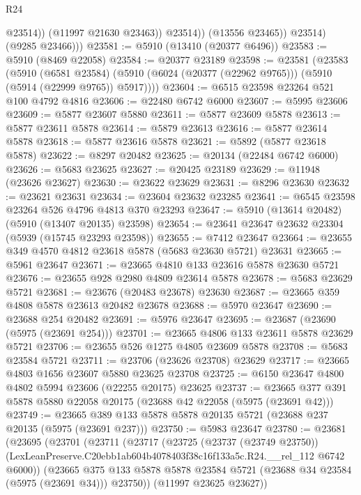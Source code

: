 \begin{lexlean}{R24}
\begin{coremodule}
                      @23514))
                  (@11997 @21630 @23463))
                @23514))
            (@13556 @23465))
          @23514)
        (@9285 @23466)))
@23581 := @5910 (@13410 (@20377 @6496))
@23583 := @5910 (@8469 @22058)
@23584 := @20377 @23189
@23598 := @23581
    (@23583
      (@5910
        (@6581 @23584)
        (@5910 (@6024 (@20377 (@22962 @9765))) (@5910 (@5914 (@22999 @9765)) @5917))))
@23604 := @6515 @23598 @23264 @521 @100 @4792 @4816
@23606 := @22480 @6742 @6000
@23607 := @5995 @23606
@23609 := @5877 @23607 @5880
@23611 := @5877 @23609 @5878
@23613 := @5877 @23611 @5878
@23614 := @5879 @23613
@23616 := @5877 @23614 @5878
@23618 := @5877 @23616 @5878
@23621 := @5892 (@5877 @23618 @5878)
@23622 := @8297 @20482
@23625 := @20134 (@22484 @6742 @6000)
@23626 := @5683 @23625
@23627 := @20425 @23189
@23629 := @11948 (@23626 @23627)
@23630 := @23622 @23629
@23631 := @8296 @23630
@23632 := @23621 @23631
@23634 := @23604 @23632 @23285
@23641 := @6545 @23598 @23264 @526 @4796 @4813 @370 @23293
@23647 := @5910 (@13614 @20482) (@5910 (@13407 @20135) @23598)
@23654 := @23641 @23647 @23632 @23304 (@5939 (@15745 @23293 @23598))
@23655 := @7412 @23647
@23664 := @23655 @349 @4570 @4812 @23618 @5878 (@5683 @23630 @5721) @23631
@23665 := @5961 @23647
@23671 := @23665 @4810 @133 @23616 @5878 @23630 @5721
@23676 := @23655 @928 @2980 @4809 @23614 @5878
@23678 := @5683 @23629 @5721
@23681 := @23676 (@20483 @23678) @23630
@23687 := @23665 @359 @4808 @5878 @23613 @20482 @23678
@23688 := @5970 @23647
@23690 := @23688 @254 @20482
@23691 := @5976 @23647
@23695 := @23687 (@23690 (@5975 (@23691 @254)))
@23701 := @23665 @4806 @133 @23611 @5878 @23629 @5721
@23706 := @23655 @526 @1275 @4805 @23609 @5878
@23708 := @5683 @23584 @5721
@23711 := @23706 (@23626 @23708) @23629
@23717 := @23665 @4803 @1656 @23607 @5880 @23625 @23708
@23725 := @6150 @23647 @4800 @4802 @5994 @23606 (@22255 @20175) @23625
@23737 := @23665 @377 @391 @5878 @5880 @22058 @20175 (@23688 @42 @22058 (@5975 (@23691 @42)))
@23749 := @23665 @389 @133 @5878 @5878 @20135 @5721 (@23688 @237 @20135 (@5975 (@23691 @237)))
@23750 := @5983 @23647
@23780 := @23681
    (@23695
      (@23701
        (@23711
          (@23717
            (@23725
              (@23737 (@23749 @23750))
              (LexLeanPreserve.C20ebb1ab604b4078403f38c16f133a5c.R24.__rel_112 @6742 @6000))
            (@23665
              @375
              @133
              @5878
              @5878
              @23584
              @5721
              (@23688 @34 @23584 (@5975 (@23691 @34)))
              @23750))
          (@11997 @23625 @23627))

\end{coremodule}
\end{lexlean}
